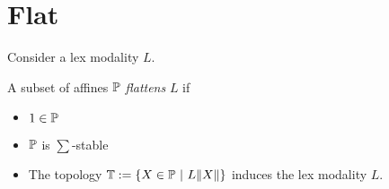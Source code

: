 \section{Flat}
Consider a lex modality $L$.
\begin{definition}
	A subset of affines $\mathbb{P}$ \emph{flattens} $L$ if
	\begin{itemize}
		\item $1 \in \mathbb{P}$
		\item $\mathbb{P}$ is $\sum$-stable
		\item The topology $\bT := \{ X \in \bP \ | \ L \| X \| \}$ induces the lex modality $L$.

	\end{itemize}
	
\end{definition}

